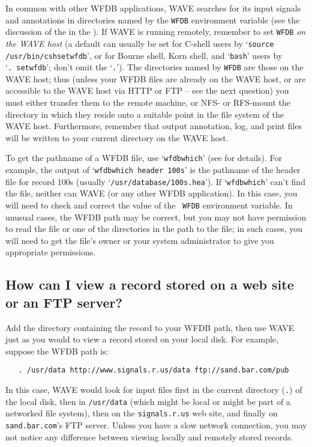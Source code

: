 \documentclass[twoside]{book}
\newcommand{\WAVE}{{\sf WAVE}\xspace}
\begin{document}
In common with other WFDB applications, \WAVE{} searches for its input
signals and annotations in directories named by the {\tt WFDB}
environment variable (see the discussion of the 
 in the 
).
If \WAVE{} is running remotely,
remember to set {\tt WFDB} \emph{on the \WAVE{} host}
\index{WAVE host@\WAVE{} host}
(a default can
usually be set for C-shell users by `{\tt source
/usr/bin/cshsetwfdb}', or for Bourne shell, Korn shell, and `{\tt bash}'
users by `{\tt .~setwfdb}'; don't omit the `{\tt .}').  The directories
named by {\tt WFDB} are those on the \WAVE{} host; thus (unless your WFDB
files are already on the \WAVE{} host, or are accessible to the \WAVE{} host
via HTTP or FTP -- see the next question) you must either transfer them
to the remote machine, or NFS- or RFS-mount the directory in which they reside
onto a suitable point in the file system of the \WAVE{} host.  Furthermore,
remember that output annotation, log, and print files will be written
to your current directory on the \WAVE{} host.

To get the pathname of a WFDB file, use `{\tt wfdbwhich}' (see
for details).  For example, the output of `{\tt wfdbwhich
header 100s}' is the pathname of the header file for record 100s
(usually `{\tt /usr/database/100s.hea}').  If `{\tt wfdbwhich}'
can't find the file, neither can \WAVE{} (or any other WFDB application).
In this case, you will need to check and correct the value of the {\tt
WFDB} environment variable.  In unusual cases, the WFDB path may be
correct, but you may not have permission to read the file or one of
the directories in the path to the file; in such cases, you will need
to get the file's owner or your system administrator to give you
appropriate permissions.

\subsection{How can I view a record stored on a web site or an FTP server?}

Add the directory containing the record to your WFDB path, then use \WAVE{}
just as you would to view a record stored on your local disk.  For example,
suppose the WFDB path is:
\begin{verbatim}
   . /usr/data http://www.signals.r.us/data ftp://sand.bar.com/pub
\end{verbatim}
In this case, \WAVE{} would look for input files first in the current directory
({\tt .}) of the local disk, then in {\tt /usr/data} (which might be
local or might be part of a networked file system), then on the
{\tt signals.r.us} web site, and finally on {\tt sand.bar.com}'s FTP server.
Unless you have a slow network connection, you may not notice any difference
between viewing locally and remotely stored records.
\end{document}
